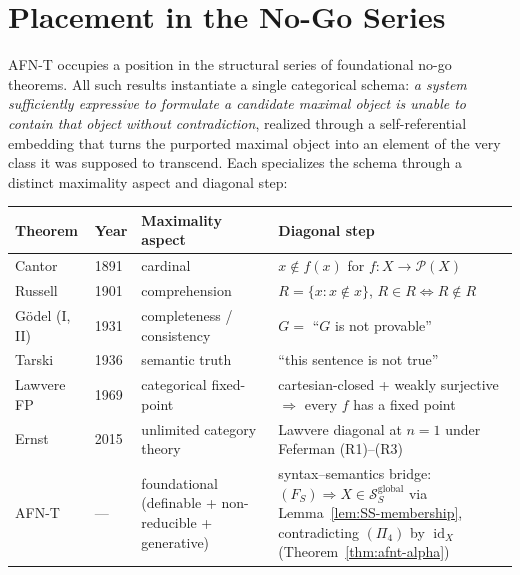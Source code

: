 \documentclass[11pt]{article}
\theoremstyle{plain}
\theoremstyle{definition}
\newcommand{\cS}{\mathcal{S}}
\newcommand{\cP}{\mathcal{P}}
\DeclareMathOperator{\id}{id}
\begin{document}
\section{Placement in the No-Go Series}\label{sec:series}

AFN-T occupies a position in the structural series of foundational no-go theorems. All such results instantiate a single categorical schema: \emph{a system sufficiently expressive to formulate a candidate maximal object is unable to contain that object without contradiction}, realized through a self-referential embedding that turns the purported maximal object into an element of the very class it was supposed to transcend. Each specializes the schema through a distinct maximality aspect and diagonal step:

\begin{center}
\begin{tabular}{@{}l l p{3.2cm} p{5.7cm}@{}}
\toprule
Theorem & Year & Maximality aspect & Diagonal step \\ \midrule
Cantor~\cite{Cantor1891} & 1891 & cardinal & $x \notin f(x)$ for $f : X \to \cP(X)$ \\
Russell~\cite{Russell1903} & 1901 & comprehension & $R = \{x : x \notin x\}$, $R \in R \iff R \notin R$ \\
G\"odel (I, II)~\cite{Godel1931} & 1931 & completeness / consistency & $G = $ ``$G$ is not provable'' \\
Tarski~\cite{Tarski1936} & 1936 & semantic truth & ``this sentence is not true'' \\
Lawvere FP~\cite{Lawvere1969} & 1969 & categorical fixed-point & cartesian-closed + weakly surjective $\Rightarrow$ every $f$ has a fixed point \\
Ernst~\cite{Ernst2015} & 2015 & unlimited category theory & Lawvere diagonal at $n = 1$ under Feferman (R1)--(R3) \\
AFN-T & --- & foundational (definable + non-reducible + generative) & syntax--semantics bridge: $(F_S) \Rightarrow X \in \cS_S^{\mathrm{global}}$ via Lemma~\ref{lem:SS-membership}, contradicting $(\Pi_4)$ by $\id_X$ (Theorem~\ref{thm:afnt-alpha}) \\
\bottomrule
\end{tabular}
\end{center}
\end{document}
